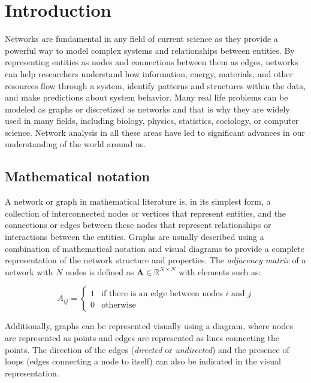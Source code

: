 
\chapter[Introduction]{Introduction}
\label{chap:intro}

Networks are fundamental in any field of current science as they provide a powerful way to model complex systems and relationships between entities. By representing entities as nodes and connections between them as edges, networks can help researchers understand how information, energy, materials, and other resources flow through a system, identify patterns and structures within the data, and make predictions about system behavior. Many real life problems can be modeled as graphs or discretized as networks and that is why they are widely used in many fields, including biology, physics, statistics, sociology, or computer science. Network analysis in all these areas have led to significant advances in our understanding of the world around us.

\section{Mathematical notation}
\label{sec:graph}
A network or graph in mathematical literature is, in its simplest form, a collection of interconnected nodes or vertices that represent entities, and the connections or edges between these nodes that represent relationships or interactions between the entities. Graphs are usually described using a combination of mathematical notation and visual diagrams to provide a complete representation of the network structure and properties. The \emph{adjacency matrix} of a network with $N$ nodes is defined as $\mathbf{A}\in\mathbb{R}^{N\times N}$ with elements such as:

\begin{equation}
  A_{ij} =
    \begin{cases}
      1 & \text{if there is an edge between nodes $i$ and $j$}\\
      0 & \text{otherwise}
    \end{cases}       
\end{equation}

Additionally, graphs can be represented visually using a diagram, where nodes are represented as points and edges are represented as lines connecting the points. The direction of the edges (\textit{directed} or \textit{undirected}) and the presence of loops (edges connecting a node to itself) can also be indicated in the visual representation.

